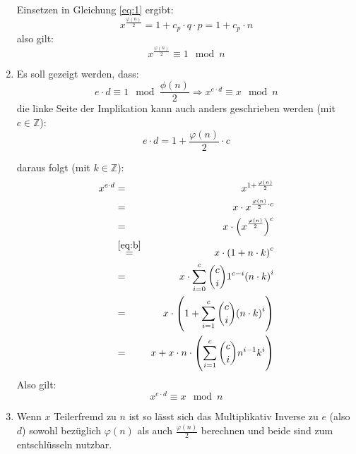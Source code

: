 \documentclass[DIN, pagenumber=false, fontsize=11pt, parskip=half]{scrartcl}
\begin{document}
\begin{enumerate}[label=(\roman*)]
            Einsetzen in Gleichung \ref{eq:1} ergibt:
            \begin{equation}
                x^{\frac{\varphi(n)}{2}} = 1 + c_p \cdot q \cdot p = 1 + c_p \cdot n
            \end{equation}
            also gilt:
            \begin{equation}
                x^{\frac{\varphi(n)}{2}} \equiv 1 \mod n \label{eq:b}
            \end{equation}
        \item 
            Es soll gezeigt werden, dass:
            \begin{equation}
                e \cdot d \equiv 1 \mod \frac{\phi(n)}{2} \Rightarrow
                    x^{e \cdot d} \equiv x \mod n
            \end{equation}
            die linke Seite der Implikation kann auch anders geschrieben werden
            (mit $c \in \mathbb{Z}$):
            \begin{equation}
                e \cdot d = 1 + \frac{\varphi(n)}{2} \cdot c
            \end{equation}
            
            daraus folgt (mit $k \in \mathbb{Z}$):
            \begin{eqnarray}
                x^{e \cdot d} &=& x^{1 + \frac{\varphi(n)}{2}} \\
                    &=& x \cdot x^{\frac{\varphi(n)}{2} \cdot c} \\
                    &=& x \cdot {\left(x^{\frac{\varphi(n)}{2}}\right)}^c \\
                    &\stackrel{\ref{eq:b}}{=}& x \cdot {\left(1 + n \cdot k\right)}^c \\
                    &=& x \cdot \sum_{i=0}^c \binom{c}{i} 1^{c-i} {\left(n \cdot k\right)}^i \\
                    &=& x \cdot \left(1 + \sum_{i=1}^c \binom{c}{i} {\left(n \cdot k\right)}^i\right) \\
                    &=& x + x \cdot n \cdot \left(\sum_{i=1}^c \binom{c}{i} n^{i-1} k^i\right)
            \end{eqnarray}
            Also gilt:
            \begin{equation}
                x^{e \cdot d} \equiv x \mod n
            \end{equation}
        \item Wenn $x$ Teilerfremd zu $n$ ist so lässt sich das Multiplikativ Inverse
            zu $e$ (also $d$) sowohl bezüglich $\varphi(n)$ als auch $\frac{\varphi(n)}{2}$
            berechnen und beide sind zum entschlüsseln nutzbar.
    \end{enumerate}
\end{document}

